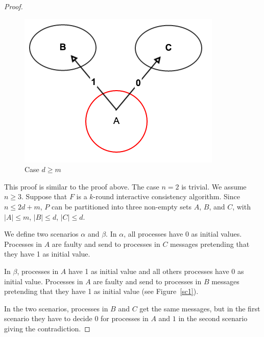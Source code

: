 \begin{proof}
\begin{figure}[h]
  \centering
  \includegraphics[scale=0.35]{impossible2.png}
  \caption{Case $d \geqslant m$  }
\end{figure}\label{sc2}

  This proof is similar to the proof above. 
  The case $n=2$ is trivial. We assume $n \geqslant 3$.
  Suppose that $F$ is a $k$-round  interactive
  consistency algorithm. Since $n \leqslant 2d+m$, $P$ can be partitioned into
  three non-empty sets $A$, $B$, and $C$, with $| A | \leqslant m$, $| B | \leqslant d$, $| C |
  \leqslant d$. 
  
   We define two scenarios $\alpha$ and $\beta$.
  In $\alpha$, all processes have 0 as initial values.
  Processes in $A$ are faulty and send to processes in $C$  messages
  pretending that they have  1 as initial value. 
  
   In $\beta$, processes in $A$ have 1 as initial value and all  others processes have 0 as initial value.
  Processes in $A$ are faulty and send to processes in $B$ messages 
  pretending that they have 1 as initial value (see Figure~\ref{sc1}).
  
  In the two scenarios, processes in $B$ and $C$  get the same messages, but in the first scenario 
  they have to decide 0 for processes in $A$ and $1$ in the second scenario giving the contradiction.
    

\end{proof}
